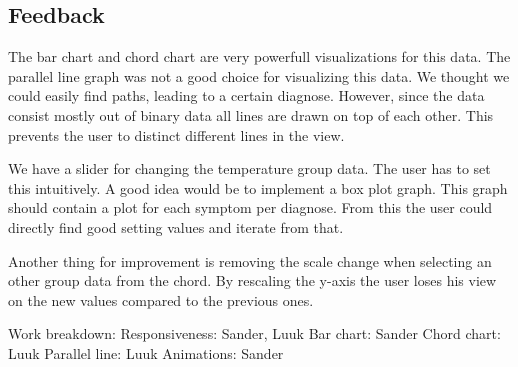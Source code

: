\documentclass[a4paper,twoside,11pt]{article}
\begin{document}
\subsection{Feedback}
The bar chart and chord chart are very powerfull visualizations for this data. The parallel line graph was not a good choice for visualizing this data. We thought we could easily find paths, leading to a certain diagnose. However, since the data consist mostly out of binary data all lines are drawn on top of each other. This prevents the user to distinct different lines in the view. 

We have a slider for changing the temperature group data. The user has to set this intuitively. A good idea would be to implement a box plot graph. This graph should contain a plot for each symptom per diagnose. From this the user could directly find good setting values and iterate from that.

Another thing for improvement is removing the scale change when selecting an other group data from the chord. By rescaling the y-axis the user loses his view on the new values compared to the previous ones.

Work breakdown:
Responsiveness: Sander, Luuk
Bar chart: Sander
Chord chart: Luuk
Parallel line: Luuk
Animations: Sander
\end{document}
